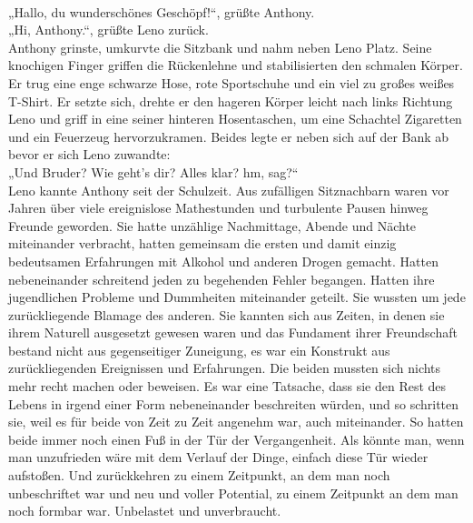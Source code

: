 \documentclass[ngerman,smalldemyvopaper,11pt,oneside,onecolumn,openright,extrafontsizes]{memoir}
\begin{document}
\vspace{0.5em} \\
„Hallo, du wunderschönes Geschöpf!“, grüßte Anthony.
\vspace{0.5em} \\
„Hi, Anthony.“, grüßte Leno zurück.
\vspace{0.5em} \\
Anthony grinste, umkurvte die Sitzbank und nahm neben Leno Platz. Seine knochigen Finger griffen die Rückenlehne und stabilisierten den schmalen Körper. Er trug eine enge schwarze Hose, rote Sportschuhe und ein viel zu großes weißes T-Shirt. Er setzte sich, drehte er den hageren Körper leicht nach links Richtung Leno und griff in eine seiner hinteren Hosentaschen, um eine Schachtel Zigaretten und ein Feuerzeug hervorzukramen. Beides legte er neben sich auf der Bank ab bevor er sich Leno zuwandte:
\vspace{0.5em} \\
„Und Bruder? Wie geht's dir? Alles klar? hm, sag?“
\vspace{0.5em} \\
Leno kannte Anthony seit der Schulzeit. Aus zufälligen Sitznachbarn waren vor Jahren über viele ereignislose Mathestunden und turbulente Pausen hinweg Freunde geworden. Sie hatte unzählige Nachmittage, Abende und Nächte miteinander verbracht, hatten gemeinsam die ersten und damit einzig bedeutsamen Erfahrungen mit Alkohol und anderen Drogen gemacht. Hatten nebeneinander schreitend jeden zu begehenden Fehler begangen. Hatten ihre jugendlichen Probleme und Dummheiten miteinander geteilt. Sie wussten um jede zurückliegende Blamage des anderen. Sie kannten sich aus Zeiten, in denen sie ihrem Naturell ausgesetzt gewesen waren und das Fundament ihrer Freundschaft bestand nicht aus gegenseitiger Zuneigung, es war ein Konstrukt aus zurückliegenden Ereignissen und Erfahrungen. Die beiden mussten sich nichts mehr recht machen oder beweisen. Es war eine Tatsache, dass sie den Rest des Lebens in irgend einer Form nebeneinander beschreiten würden, und so schritten sie, weil es für beide von Zeit zu Zeit angenehm war, auch miteinander. So hatten beide immer noch einen Fuß in der Tür der Vergangenheit. Als könnte man, wenn man unzufrieden wäre mit dem Verlauf der Dinge, einfach diese Tür wieder aufstoßen. Und zurückkehren zu einem Zeitpunkt, an dem man noch unbeschriftet war und neu und voller Potential, zu einem Zeitpunkt an dem man noch formbar war. Unbelastet und unverbraucht.
\vspace{0.5em} \\
\end{document}
